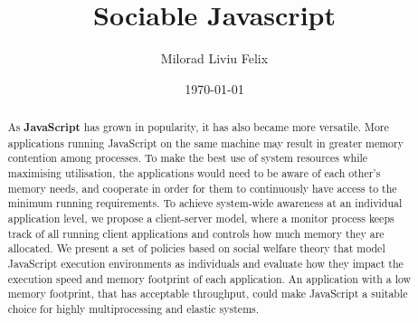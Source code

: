 \documentclass{l4proj}
\begin{document}
\title{Sociable Javascript}
\author{Milorad Liviu Felix}
\date{\today}
\maketitle
\educationalconsent
%
%
\newpage
\begin{abstract}
   As \textbf{JavaScript} has grown in popularity, it has also became more versatile. More applications running JavaScript on the same machine may result in greater memory contention among processes. To make the best use of system resources while maximising utilisation, the applications would need to be aware of each other's memory needs, and cooperate in order for them to continuously have access to the minimum running requirements. To achieve system-wide awareness at an individual application level, we propose a client-server model, where a monitor process keeps track of all running client applications and controls how much memory they are allocated. We present a set of policies based on social welfare theory that model JavaScript execution environments as individuals and evaluate how they impact the execution speed and memory footprint of each application. An application with a low memory footprint, that has acceptable throughput, could make JavaScript a suitable choice for highly multiprocessing and elastic systems.
\end{abstract}
\newpage
\tableofcontents
\newpage
\end{document}
